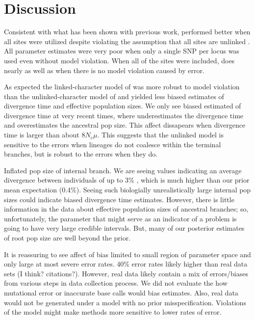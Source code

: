 \section{Discussion}

Consistent with what has been shown with previous work, \ecoevolity performed 
better when all sites were utilized despite violating the assumption that all 
sites are unlinked \citep{Oaks2018ecoevolity}. All parameter estimates were very
poor when only a single SNP per locus was used even without model violation. 
When all of the sites were included, \ecoevolity does nearly as well as \beast 
when there is no model violation caused by error.

As expected the linked-character model of \ecoevolity was more robust to model 
violation than the unlinked-character model of \beast and yielded less biased 
estimates of divergence time and effective population sizes. 
We only see biased estimated of divergence time at very recent times, 
where \ecoevolity
underestimates the divergence time and overestimates the ancestral pop size.
This affect dissapears when divergence time is larger than about $8N_e\mu$.
This suggests that the unlinked model is sensitive to the errors
when lineages do not coalesce within the terminal branches,
but is robust to the errors when they do.

Inflated pop size of internal branch.
We are seeing values indicating an average divergence between individuals of up
to 3\% \rootfigs, which is much higher than our prior mean expectation (0.4\%).
Seeing such biologially unrealistically large internal pop sizes could indicate
biased divergence time estimates.
However, there is little information in the data about effective population sizes 
of ancestral branches; so, unfortunately, the parameter that might serve as an indicator
of a problem is going to have very large credible intervals.
But, many of our posterior estimates of root pop size are well beyond the
prior.

It is reassuring to see affect of bias limited to small region of parameter 
space and only large at most severe error rates.
40\% error rates likely higher than real data sets (I think? citations?).
However, real data likely contain a mix of errors/biases from
various steps in data collection process. We did not evaluate the how mutational
error or inaccurate base calls would bias estimates.
Also, real data would not be generated under a model with no prior misspecification.
Violations of the model might make methods more sensitive to lower rates of error.

